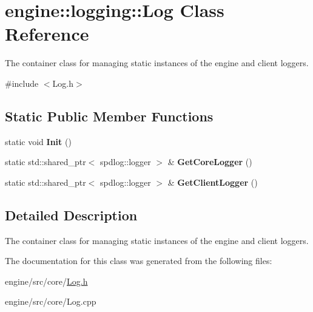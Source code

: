 \hypertarget{classengine_1_1logging_1_1Log}{}\section{engine\+:\+:logging\+:\+:Log Class Reference}
\label{classengine_1_1logging_1_1Log}


The container class for managing static instances of the engine and client loggers.  




{\ttfamily \#include $<$Log.\+h$>$}

\subsection*{Static Public Member Functions}
\begin{DoxyCompactItemize}
\item 
\mbox{\label{classengine_1_1logging_1_1Log_a1364bca4f007e2931a0110f91e3e13c4}} 
static void {\bfseries Init} ()
\item 
\mbox{\label{classengine_1_1logging_1_1Log_ad54813613a17e01d3272b9fb124b049e}} 
static std\+::shared\+\_\+ptr$<$ spdlog\+::logger $>$ \& {\bfseries Get\+Core\+Logger} ()
\item 
\mbox{\label{classengine_1_1logging_1_1Log_abae59faa07a4ce0d627772e79073c67b}} 
static std\+::shared\+\_\+ptr$<$ spdlog\+::logger $>$ \& {\bfseries Get\+Client\+Logger} ()
\end{DoxyCompactItemize}


\subsection{Detailed Description}
The container class for managing static instances of the engine and client loggers. 

The documentation for this class was generated from the following files\+:\begin{DoxyCompactItemize}
\item 
engine/src/core/\hyperlink{Log_8h}{Log.\+h}\item 
engine/src/core/Log.\+cpp\end{DoxyCompactItemize}
